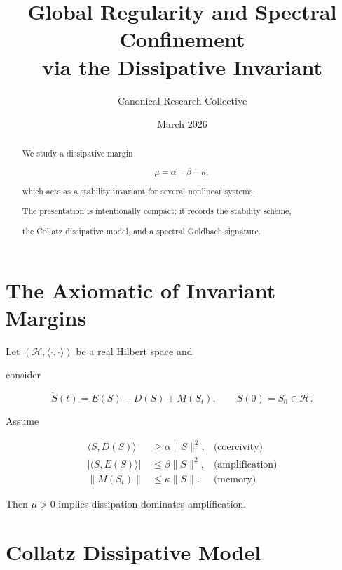 ﻿\documentclass[11pt,a4paper]{amsart}
\title{Global Regularity and Spectral Confinement\\via the Dissipative Invariant}
\author{Canonical Research Collective}
\date{March 2026}
\newcommand{\alphacoeff}{\ensuremath{\alpha}}
\newcommand{\betacoeff}{\ensuremath{\beta}}
\newcommand{\kappacoeff}{\ensuremath{\kappa}}
\newcommand{\mumargin}{\ensuremath{\mu}}
\begin{document}
\begin{abstract}

We study a dissipative margin

\[

  \mumargin = \alphacoeff - \betacoeff - \kappacoeff,

\]

which acts as a stability invariant for several nonlinear systems.

The presentation is intentionally compact: it records the stability scheme,

the Collatz dissipative model, and a spectral Goldbach signature.

\end{abstract}



\maketitle



\section{The Axiomatic of Invariant Margins}

Let $(\mathcal{H},\langle\cdot,\cdot\rangle)$ be a real Hilbert space and

consider

\[

  \dot{S}(t)=E(S)-D(S)+M(S_t), \qquad S(0)=S_0\in\mathcal{H}.

\]

Assume

\begin{align}

  \langle S,D(S)\rangle &\ge \alphacoeff\|S\|^{2}, & \text{(coercivity)} \\

  |\langle S,E(S)\rangle| &\le \betacoeff\|S\|^{2}, & \text{(amplification)} \\

  \|M(S_t)\| &\le \kappacoeff\|S\|. & \text{(memory)}

\end{align}

Then $\mumargin>0$ implies dissipation dominates amplification.



\section{Collatz Dissipative Model}
\end{document}
